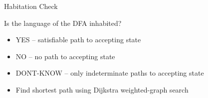 \newsavebox\demoHbox
\begin{lrbox}{\demoHbox}
  \begin{minipage}{8cm}
    
  \end{minipage}
\end{lrbox}


\newsavebox\demoIbox
\begin{lrbox}{\demoIbox}
  \begin{minipage}{8cm}
    
  \end{minipage}
\end{lrbox}

\newsavebox\demoJbox
\begin{lrbox}{\demoJbox}
  \begin{minipage}{8cm}
    
  \end{minipage}
\end{lrbox}

\newsavebox\demoKbox
\begin{lrbox}{\demoKbox}
  \begin{minipage}{8cm}
    
  \end{minipage}
\end{lrbox}



\begin{frame}{Habitation Check}

  Is the language of the DFA inhabited?
  \begin{itemize}
  \item<1->{YES -- satisfiable path to accepting state}
  \item<2->{NO -- no path to accepting state}
  \item<3->{DONT-KNOW -- only indeterminate paths to accepting state}
  \item<4>{Find shortest path using Dijkstra weighted-graph search}
  \end{itemize}

\end{frame}
